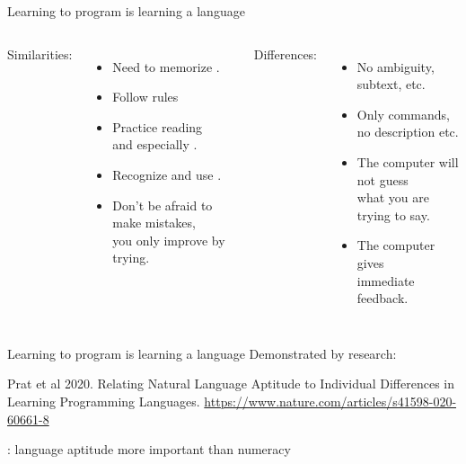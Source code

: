 \documentclass[aspectratio=169,usenames,dvipsnames]{beamer}
\begin{document}
\begin{frame}{Learning to program is learning a language}
\begin{columns}[T]
Similarities:
\begin{itemize}
	\item Need to memorize .
	\item Follow  rules
	\item Practice reading \\
			and especially .
	\item Recognize and use .
	\item Don't be afraid to make mistakes, \\
		you only improve by trying.
\end{itemize}
\pause Differences:
\pause
\begin{itemize}
	\item No ambiguity, subtext, etc.
	\item Only commands, \\
        no description etc.
	\item The computer will not guess \\
        what you are trying to say.
	\item The computer gives \\
        immediate feedback.
\end{itemize}
\end{columns}
\end{frame}

\begin{frame}{Learning to program is learning a language}
Demonstrated by research:

\vspace{1em}
Prat et al 2020.
Relating Natural Language Aptitude to Individual Differences
in Learning Programming Languages.
\url{https://www.nature.com/articles/s41598-020-60661-8}

\vspace{1em}
    : language aptitude more important than numeracy
\end{frame}

\end{document}
